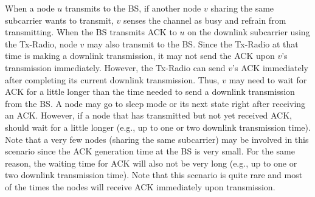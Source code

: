 When a node $u$ transmits to the BS, if another node $v$ sharing the same subcarrier wants to transmit, $v$ senses the channel as busy and refrain from transmitting. When the BS transmits ACK to $u$ on the downlink subcarrier using the Tx-Radio, node $v$ may also transmit to the BS. Since the Tx-Radio at that time is making a downlink transmission, it may not send the ACK upon $v$'s transmission immediately. However, the Tx-Radio can send $v$'s ACK immediately after completing its current downlink transmission. Thus, $v$ may need to wait for ACK for a little longer than the time needed to send a downlink transmission from the BS. A node may go to sleep mode or its next state right after receiving an ACK. However, if a node that has transmitted but not yet received ACK, should wait for a little longer (e.g., up to one or two downlink transmission time). Note that a very few nodes (sharing the same subcarrier) may be involved in this scenario since the ACK generation time at the BS is very small. For the same reason, the waiting time for ACK will also not be very long (e.g., up to one or two downlink transmission time). Note that this scenario is quite rare and most of the times the nodes will receive ACK immediately upon transmission.



